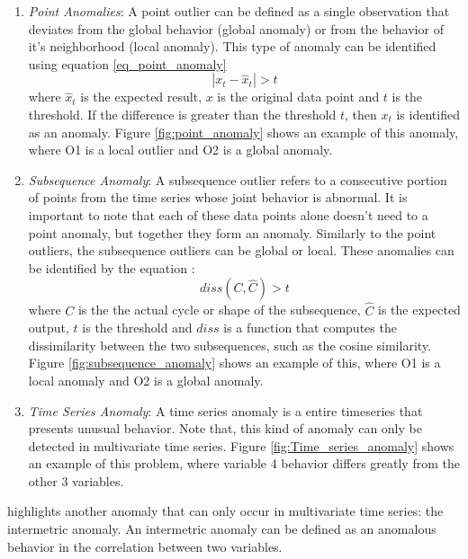 \begin{enumerate}
    \item \textit{Point Anomalies}: A point outlier can be defined as a single observation that deviates from the global behavior (global anomaly) or from the behavior of it's neighborhood (local anomaly). This type of anomaly can be identified using equation \ref{eq_point_anomaly}
    \begin{equation}
        |x_t - \hat{x}_t| > t
        \label{eq_point_anomaly}
    \end{equation}
    where $\hat{x}_t$ is the expected result, $x$ is the original data point and $t$ is the threshold. If the difference is greater than the threshold $t$, then $x_t$ is identified as an anomaly. Figure \ref{fig:point_anomaly} shows an example of this anomaly, where O1 is a local outlier and O2 is a global anomaly.

    \item \textit{Subsequence Anomaly}: A subsequence outlier refers to a consecutive portion of points from the time series whose joint behavior is abnormal. It is important to note that each of these data points alone doesn't need to a point anomaly, but together they form an anomaly. Similarly to the point outliers, the subsequence outliers can be global or local. These anomalies can be identified by the equation \cite{Zamanzadeh_Darban_Webb_Pan_Aggarwal_Salehi_2024}:
    \begin{equation}
        diss\left(C, \hat{C}\right) > t
    \end{equation}
    where $C$ is the the actual cycle or shape of the subsequence, $\hat{C}$ is the expected output, $t$ is the threshold and $diss$ is a function that computes the dissimilarity between the two subsequences, such as the cosine similarity. Figure \ref{fig:subsequence_anomaly} shows an example of this, where O1 is a local anomaly and O2 is a global anomaly.

    \item \textit{Time Series Anomaly}: A time series anomaly is a entire timeseries that presents unusual behavior. Note that, this kind of anomaly can only be detected in multivariate time series. Figure \ref{fig:Time_series_anomaly} shows an example of this problem, where variable 4 behavior differs greatly from the other 3 variables.
\end{enumerate}

\cite{Zamanzadeh_Darban_Webb_Pan_Aggarwal_Salehi_2024} highlights another anomaly that can only occur in multivariate time series: the intermetric anomaly. An intermetric anomaly can be defined as an anomalous behavior in the correlation between two variables.%


